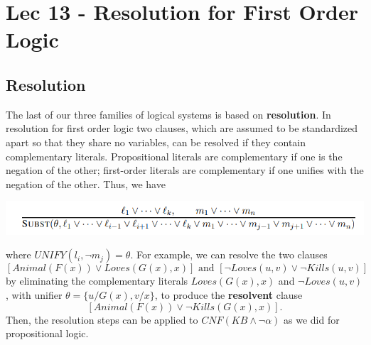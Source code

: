 \chapter{Lec 13 - Resolution for First Order Logic}

\section{Resolution}
The last of our three families of logical systems is based on \textbf{resolution}. In resolution for first order logic two clauses, which are assumed to be standardized apart so
that they share no variables, can be resolved if they contain complementary literals. Propositional literals are complementary if one is the negation of the other; first-order literals are complementary if one unifies with the negation of the other. Thus, we have
\begin{center}
    \includegraphics[]{images/resolution-fol.png}
\end{center}
where $UNIFY(l_i,\neg{m_j} ) = \theta$. For example, we can resolve the two clauses
\[[Animal(F(x)) \lor Loves(G(x), x)]\,\, \text{and} \,\,[\neg Loves(u, v) \lor \neg Kills(u, v)]\]
by eliminating the complementary literals $Loves(G(x), x)$ and $\neg Loves(u, v)$, with unifier $\theta = \{u/G(x), v/x\}$, to produce the \textbf{resolvent} clause
\[[Animal(F(x)) \lor \neg Kills(G(x), x)] .
\]
Then, the resolution steps can be applied to $CNF(KB \land \neg \alpha)$ as we did for propositional logic.

